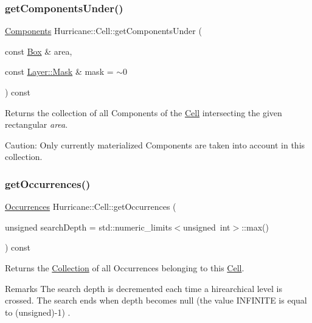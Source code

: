 \subsubsection{\texorpdfstring{get\+Components\+Under()}{getComponentsUnder()}}
{\footnotesize\ttfamily \mbox{\hyperlink{namespaceHurricane_a7d26d99aeb5dd6d70d51bd35d2473e72}{Components}} Hurricane\+::\+Cell\+::get\+Components\+Under (\begin{DoxyParamCaption}\item[{const \mbox{\hyperlink{classHurricane_1_1Box}{Box}} \&}]{area,  }\item[{const \mbox{\hyperlink{classHurricane_1_1Layer_af5277c670637bd5d910237e7afe01a91}{Layer\+::\+Mask}} \&}]{mask = {\ttfamily $\sim$0} }\end{DoxyParamCaption}) const}

Returns the collection of all Components of the \mbox{\hyperlink{classHurricane_1_1Cell}{Cell}} intersecting the given rectangular {\itshape area}.

\begin{DoxyParagraph}{Caution\+: Only currently materialized Components are taken into account}
in this collection. 
\end{DoxyParagraph}
\mbox{\label{classHurricane_1_1Cell_ab5bbab0a59106855d61deb94805e6115}} 
\subsubsection{\texorpdfstring{get\+Occurrences()}{getOccurrences()}}
{\footnotesize\ttfamily \mbox{\hyperlink{namespaceHurricane_a1912927c128eee859af62dbe4cbe0a6b}{Occurrences}} Hurricane\+::\+Cell\+::get\+Occurrences (\begin{DoxyParamCaption}\item[{unsigned}]{search\+Depth = {\ttfamily std\+:\+:numeric\+\_\+limits$<$unsigned~int$>$\+:\+:max()} }\end{DoxyParamCaption}) const}

Returns the \mbox{\hyperlink{classHurricane_1_1Collection}{Collection}} of all Occurrences belonging to this \mbox{\hyperlink{classHurricane_1_1Cell}{Cell}}.

\begin{DoxyRemark}{Remarks}
The search depth is decremented each time a hirearchical level is crossed. The search ends when depth becomes null (the value {\ttfamily I\+N\+F\+I\+N\+I\+TE} is equal to {\ttfamily }(unsigned)-\/1) . 
\end{DoxyRemark}
\mbox{\label{classHurricane_1_1Cell_aee27efc0497992f811c9812ffa272a5a}} 
